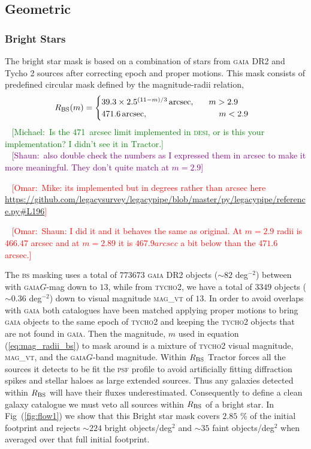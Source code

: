 \documentclass[fleqn,usenatbib]{mnras}
\newcommand{\mike}[1]{~\newline\noindent \textcolor{Green}{{ [Michael:~{#1}]\\}}}
\newcommand{\shaun}[1]{~\newline\noindent \textcolor{Purple}{{ [Shaun:~{#1}]\\}}}
\newcommand{\omar}[1]{~\newline\noindent \textcolor{red}{{ [Omar:~{#1}]\\}}}
\newcommand{\BS}{\textsc{bs}\xspace}
\newcommand{\DESI}{\textsc{desi}\xspace}
\newcommand{\GAIA}{\textsc{gaia}\xspace}
\newcommand{\PSF}{\textsc{psf}\xspace}
\newcommand{\TRACTOR}{\textsc{T}ractor\xspace}
\newcommand{\Tycho}{\textsc{tycho2}\xspace}
\begin{document}
\subsection{Geometric}\label{subsec:geometric}
\subsubsection{Bright Stars}

The bright star mask is based on a combination of stars from \GAIA DR2 \citep{2018A&A...616A...1G} and Tycho 2 \citep{2000A&A...355L..27H} sources after correcting epoch and proper motions. This mask consists of predefined circular mask defined by the magnitude-radii relation,
\begin{equation}
\label{eq:mag_radii_bs}
  R_{\rm BS}(m) =
\begin{cases}
  39.3 \times 2.5^{(11 - m)/3} \, {\rm arcsec}, \hspace{0.6cm} m > 2.9 \\
   471.6 \, {\rm arcsec}, \hspace{3cm} m < 2.9
\end{cases}
\end{equation}
\mike{Is the 471~arcsec limit implemented in \DESI, or is this your implementation?  I didn't see it in \TRACTOR.}
\shaun{also double check the numbers as I expressed them in arcsec to make it more meaningful. They don't quite match at $m=2.9$}

\omar{Mike: its implemented but in degrees rather than arcsec here \url{https://github.com/legacysurvey/legacypipe/blob/master/py/legacypipe/reference.py\#L196}}

\omar{Shaun: I did it and it behaves the same as original. At $m=2.9$ radii is $466.47$ arcsec and at $m=2.89$ it is $467.9 arcsec$ a bit below than the $471.6$ arcsec.}

The \BS masking uses a total of $773673$ \GAIA DR2 objects ($\sim 82$ deg$^{-2}$) between with \GAIA $G$-mag down to $13$, while from \Tycho, we have a total of $3349$ objects ($\sim 0.36$ deg$^{-2}$) down to visual magnitude  \textsc{mag}\_\textsc{vt} of $13$. In order to avoid overlaps with \GAIA both catalogues have been matched applying proper motions to bring \GAIA objects to the same epoch of \Tycho and keeping the \Tycho objects that are not found in \GAIA. Then the magnitude, $m$ used in equation (\ref{eq:mag_radii_bs}) to mask around is a mixture of \Tycho visual magnitude, \textsc{mag}\_\textsc{vt}, and the \GAIA $G$-band magnitude. Within $R_{\rm BS}$ \TRACTOR forces all the sources it detects to be fit the \PSF profile to avoid artificially fitting diffraction spikes and stellar haloes as large extended sources. Thus any galaxies detected within $R_{\rm BS}$ will have their 
fluxes underestimated. Consequently to define a clean galaxy catalogue we must veto all sources within  $R_{\rm BS}$ of a bright star. In Fig~(\ref{fig:flow1}) we show that this Bright star mask covers $2.85$ \% of the initial footprint and rejects $\sim 224$ bright objects/deg$^{2}$ and $\sim 35$ faint objects/deg$^{2}$ when averaged over that full initial footprint.
\end{document}
